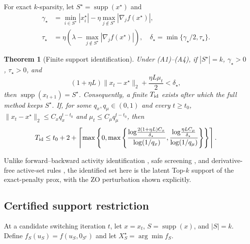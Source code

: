 \documentclass{article}
\newtheorem{theorem}{Theorem}
\newcommand{\supp}{\operatorname{supp}}
\begin{document}
For exact $k$-sparsity, let $S^\star=\supp(x^\star)$ and
\begin{align}
\gamma_\star&=\min_{i\in S^\star}|x_i^\star|-\eta\max_{j\notin S^\star}|\nabla_j f(x^\star)|,\nonumber\\
\tau_\star&=\eta\!\left(\lambda-\max_{j\notin S^\star}|\nabla_j f(x^\star)|\right),\quad
\delta_\star=\min\{\gamma_\star/2,\tau_\star\}.
\label{eq:margins}
\end{align}

\begin{theorem}[Finite support identification]\label{thm:id}
Under (A1)--(A4), if $|S^\star|=k$, $\gamma_\star>0$, $\tau_\star>0$, and
\begin{equation}
 (1+\eta L)\|x_t-x^\star\|_2+\frac{\eta L\mu_t}{2}<\delta_\star,
 \label{eq:idcond}
\end{equation}
then $\supp(x_{t+1})=S^\star$. Consequently, a finite $T_{\rm id}$ exists after which the full method keeps $S^\star$. If, for some $q_x,q_\mu\in(0,1)$ and every $t\ge t_0$,
$\|x_t-x^\star\|_2\le C_xq_x^{t-t_0}$ and
$\mu_t\le C_\mu q_\mu^{t-t_0}$, then
\begin{equation}
T_{\rm id}
\le
t_0+2+\left\lceil\max\left\{0,
\max\left\{
\frac{\log\!\frac{2(1+\eta L)C_x}{\delta_\star}}{\log(1/q_x)},
\frac{\log\!\frac{\eta LC_\mu}{\delta_\star}}{\log(1/q_\mu)}
\right\}
\right\}\right\rceil .
\label{eq:tid}
\end{equation}
\end{theorem}
Unlike forward--backward activity identification \cite{liang2017activity,dai2022inexact}, safe screening \cite{ndiaye2017gapsafe}, and derivative-free active-set rules \cite{lewis2009active,brilli2026complexity}, the identified set here is the latent Top-$k$ support of the exact-penalty prox, with the ZO perturbation shown explicitly.

\subsection{Certified support restriction}
At a candidate switching iteration $t$, let $x=x_t$, $S=\supp(x)$, and $|S|=k$. Define $f_S(u_S)=f(u_S,0_{S^c})$ and let $X_S^\star=\arg\min f_S$.
\end{document}
